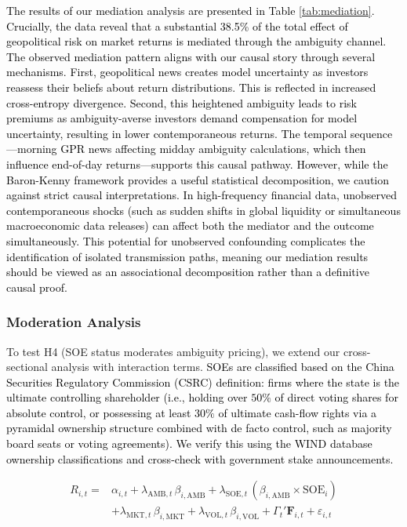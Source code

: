 \documentclass[preprint,12pt,authoryear]{elsarticle}
\begin{document}
\textcolor{black}{\textcolor{black}{The results of our mediation analysis are presented in Table \ref{tab:mediation}. Crucially, the data reveal that a substantial 38.5\% of the total effect of geopolitical risk on market returns is mediated through the ambiguity channel. The observed mediation pattern aligns with our causal story through several mechanisms.} First, geopolitical news creates model uncertainty as investors reassess their beliefs about return distributions. This is reflected in increased cross-entropy divergence. Second, this heightened ambiguity leads to risk premiums as ambiguity-averse investors demand compensation for model uncertainty, resulting in lower contemporaneous returns. The temporal sequence---morning GPR news affecting midday ambiguity calculations, which then influence end-of-day returns---supports this causal pathway.} \textcolor{black}{However, while the Baron-Kenny framework provides a useful statistical decomposition, we caution against strict causal interpretations. In high-frequency financial data, unobserved contemporaneous shocks (such as sudden shifts in global liquidity or simultaneous macroeconomic data releases) can affect both the mediator and the outcome simultaneously. This potential for unobserved confounding complicates the identification of isolated transmission paths, meaning our mediation results should be viewed as an associational decomposition rather than a definitive causal proof.}

\subsubsection{Moderation Analysis}

To test H4 (SOE status moderates ambiguity pricing), we extend our cross-sectional analysis with interaction terms. \textcolor{black}{SOEs are classified based on the China Securities Regulatory Commission (CSRC) definition: firms where the state is the ultimate controlling shareholder \textcolor{black}{(i.e., holding over $50\%$ of direct voting shares for absolute control, or possessing at least $30\%$ of ultimate cash-flow rights via a pyramidal ownership structure combined with de facto control, such as majority board seats or voting agreements)}. We verify this using the WIND database ownership classifications and cross-check with government stake announcements.}

\begin{equation}
\begin{split}
R_{i,t} = & \alpha_{i,t} + \lambda_{\text{AMB},t} \, \beta_{i,\text{AMB}} + \lambda_{\text{SOE},t} \, (\beta_{i,\text{AMB}} \times \text{SOE}_i) \\ 
&+ \lambda_{\text{MKT},t} \, \beta_{i,\text{MKT}} + \lambda_{\text{VOL},t} \, \beta_{i,\text{VOL}} + \Gamma_{t}' \mathbf{F}_{i,t} + \varepsilon_{i,t}
\end{split}
\end{equation}
\end{document}
